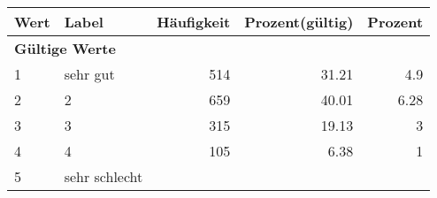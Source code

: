      \begin{longtable}{lXrrr}
     \toprule
     \textbf{Wert} & \textbf{Label} & \textbf{Häufigkeit} & \textbf{Prozent(gültig)} & \textbf{Prozent} \\
     \endhead
     \midrule
     \multicolumn{5}{l}{\textbf{Gültige Werte}}\\

     1 &
     \multicolumn{1}{X}{ sehr gut   } &


       \num{514} &
       \num[round-mode=places,round-precision=2]{31.21} &
         \num[round-mode=places,round-precision=2]{4.9} \\

     2 &
     \multicolumn{1}{X}{ 2   } &


       \num{659} &
       \num[round-mode=places,round-precision=2]{40.01} &
         \num[round-mode=places,round-precision=2]{6.28} \\

     3 &
     \multicolumn{1}{X}{ 3   } &


       \num{315} &
       \num[round-mode=places,round-precision=2]{19.13} &
         \num[round-mode=places,round-precision=2]{3} \\

     4 &
     \multicolumn{1}{X}{ 4   } &


       \num{105} &
       \num[round-mode=places,round-precision=2]{6.38} &
         \num[round-mode=places,round-precision=2]{1} \\

     5 &
     \multicolumn{1}{X}{ sehr schlecht   } &



\end{longtable}

